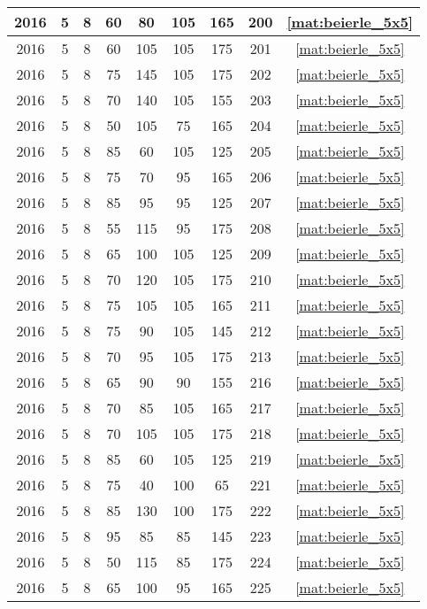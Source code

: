 \begin{longtable}{|c|c|c|c|c|c|c|c|c|}
2016 & 5 & 8 & 60 & 80 & 105 & 165 & 200 & \eqref{mat:beierle_5x5} \\ \hline 
2016 & 5 & 8 & 60 & 105 & 105 & 175 & 201 & \eqref{mat:beierle_5x5} \\ \hline 
2016 & 5 & 8 & 75 & 145 & 105 & 175 & 202 & \eqref{mat:beierle_5x5} \\ \hline 
2016 & 5 & 8 & 70 & 140 & 105 & 155 & 203 & \eqref{mat:beierle_5x5} \\ \hline 
2016 & 5 & 8 & 50 & 105 & 75 & 165 & 204 & \eqref{mat:beierle_5x5} \\ \hline 
2016 & 5 & 8 & 85 & 60 & 105 & 125 & 205 & \eqref{mat:beierle_5x5} \\ \hline 
2016 & 5 & 8 & 75 & 70 & 95 & 165 & 206 & \eqref{mat:beierle_5x5} \\ \hline 
2016 & 5 & 8 & 85 & 95 & 95 & 125 & 207 & \eqref{mat:beierle_5x5} \\ \hline 
2016 & 5 & 8 & 55 & 115 & 95 & 175 & 208 & \eqref{mat:beierle_5x5} \\ \hline 
2016 & 5 & 8 & 65 & 100 & 105 & 125 & 209 & \eqref{mat:beierle_5x5} \\ \hline 
2016 & 5 & 8 & 70 & 120 & 105 & 175 & 210 & \eqref{mat:beierle_5x5} \\ \hline 
2016 & 5 & 8 & 75 & 105 & 105 & 165 & 211 & \eqref{mat:beierle_5x5} \\ \hline 
2016 & 5 & 8 & 75 & 90 & 105 & 145 & 212 & \eqref{mat:beierle_5x5} \\ \hline 
2016 & 5 & 8 & 70 & 95 & 105 & 175 & 213 & \eqref{mat:beierle_5x5} \\ \hline 
2016 & 5 & 8 & 65 & 90 & 90 & 155 & 216 & \eqref{mat:beierle_5x5} \\ \hline 
2016 & 5 & 8 & 70 & 85 & 105 & 165 & 217 & \eqref{mat:beierle_5x5} \\ \hline 
2016 & 5 & 8 & 70 & 105 & 105 & 175 & 218 & \eqref{mat:beierle_5x5} \\ \hline 
2016 & 5 & 8 & 85 & 60 & 105 & 125 & 219 & \eqref{mat:beierle_5x5} \\ \hline 
2016 & 5 & 8 & 75 & 40 & 100 & 65 & 221 & \eqref{mat:beierle_5x5} \\ \hline 
2016 & 5 & 8 & 85 & 130 & 100 & 175 & 222 & \eqref{mat:beierle_5x5} \\ \hline 
2016 & 5 & 8 & 95 & 85 & 85 & 145 & 223 & \eqref{mat:beierle_5x5} \\ \hline 
2016 & 5 & 8 & 50 & 115 & 85 & 175 & 224 & \eqref{mat:beierle_5x5} \\ \hline 
2016 & 5 & 8 & 65 & 100 & 95 & 165 & 225 & \eqref{mat:beierle_5x5} \\ \hline 

\end{longtable}
